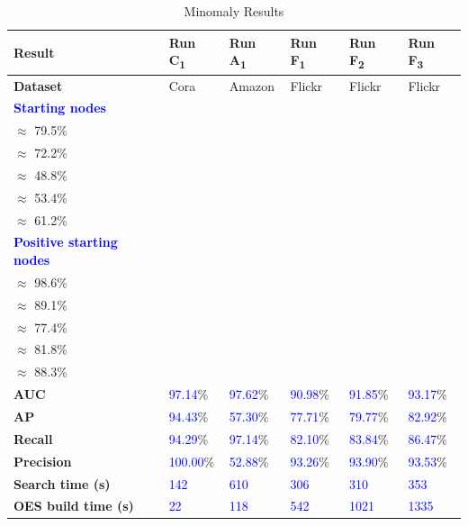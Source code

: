 \documentclass[preprint,12pt]{elsarticle}
\newcommand{\new}[1]{\textcolor{blue}{#1}}
\theoremstyle{plain}
\theoremstyle{definition}
\theoremstyle{remark}
\begin{document}
\begin{table}[htbp]
\centering
\caption{Minomaly Results}
\label{tab:minomaly_results}
\scriptsize
\begin{tabular}{|p{45pt}|l|l|l|l|l|}
\hline
\textbf{Result} & \textbf{Run C\textsubscript{1}} & \textbf{Run A\textsubscript{1}} & \textbf{Run F\textsubscript{1}} & \textbf{Run F\textsubscript{2}} & \textbf{Run F\textsubscript{3}} \\ \hline
\textbf{Dataset}   & Cora           & Amazon         & Flickr         & Flickr         & Flickr         \\ \hline
\new{\textbf{Starting nodes}} & \makecell{$\frac{2152}{2708}$ \\ $\approx$ 79.5\%} & \makecell{$\frac{9935}{13752}$ \\ $\approx$ 72.2\%} & \makecell{$\frac{43582}{89250}$ \\ $\approx$ 48.8\%} & \makecell{$\frac{47648}{89250}$ \\ $\approx$ 53.4\%} & \makecell{$\frac{54614}{89250}$ \\ $\approx$ 61.2\%} \\ \hline
\new{\textbf{Positive starting nodes}} & \makecell{$\frac{69}{70}$ \\ $\approx$ 98.6\%} & \makecell{$\frac{312}{350}$ \\ $\approx$ 89.1\%} & \makecell{$\frac{1733}{2240}$ \\ $\approx$ 77.4\%} & \makecell{$\frac{1833}{2240}$ \\ $\approx$ 81.8\%} & \makecell{$\frac{1977}{2240}$ \\ $\approx$ 88.3\%} \\ \hline
\textbf{AUC} & \new{97.14}\% & \new{97.62}\% & \new{90.98}\% & \new{91.85}\% & \new{93.17}\% \\ \hline
\textbf{AP} & \new{94.43}\% & \new{57.30}\% & \new{77.71}\% & \new{79.77}\% & \new{82.92}\% \\ \hline
\textbf{Recall} & \new{94.29}\% & \new{97.14}\% & \new{82.10}\% & \new{83.84}\% & \new{86.47}\% \\ \hline
\textbf{Precision} & \new{100.00}\% & \new{52.88}\% & \new{93.26}\% & \new{93.90}\% & \new{93.53}\% \\ \hline
\textbf{Search time (s)} & \new{142} & \new{610} & \new{306} & \new{310} & \new{353} \\ \hline
\textbf{OES build time (s)} & \new{22} & \new{118} & \new{542} & \new{1021} & \new{1335} \\ \hline
\end{tabular}
\end{table}
\end{document}
